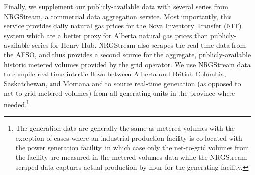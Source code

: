 \documentclass[12pt]{article}
\begin{document}
Finally, we supplement our publicly-available data with several series from NRGStream, a commercial data aggregation service. Most importantly, this service provides daily natural gas prices for the Nova Inventory Transfer (NIT) system which are a better proxy for Alberta natural gas prices than publicly-available series for Henry Hub. NRGStream also scrapes the real-time data from the AESO, and thus provides a second source for the aggregate, publicly-available historic metered volumes provided by the grid operator. We use NRGStream data to compile real-time intertie flows between Alberta and British Columbia, Saskatchewan, and Montana and to source real-time generation (as opposed to net-to-grid metered volumes) from all generating units in the province where needed.\footnote{The generation data are generally the same as metered volumes with the exception of cases where an industrial production facility is co-located with the power generation facility, in which case only the net-to-grid volumes from the facility are measured in the metered volumes data while the NRGStream scraped data captures actual production by hour for the generating facility.}
\end{document}
